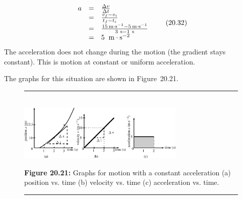     \begin{equation}
    \begin{array}{ccc}\hfill a& =& \frac{\Delta v}{\Delta t}\hfill \\ & =& \frac{{v}_{f}-{v}_{i}}{{t}_{f}-{t}_{i}}\hfill \\ & =& \frac{15\phantom{\rule{0.166667em}{0ex}}\mathrm{m}\ensuremath{\cdot}{\mathrm{s}}^{-1}-5\phantom{\rule{0.166667em}{0ex}}\mathrm{m}\ensuremath{\cdot}{\mathrm{s}}^{-1}}{3\phantom{\rule{3.33333pt}{0ex}}\mathrm{s}-1\phantom{\rule{3.33333pt}{0ex}}\mathrm{s}}\hfill \\ & =& 5\phantom{\rule{4pt}{0ex}}\phantom{\rule{0.166667em}{0ex}}\mathrm{m}\ensuremath{\cdot}{\mathrm{s}}^{-2}\hfill \end{array}\tag{20.32}
      \end{equation}
        \label{m38795*id72716}The acceleration does not change during the motion (the gradient stays constant). This is motion at constant or uniform acceleration.\par 
        \label{m38795*id72723}The graphs for this situation are shown in Figure~20.21.\par 
    \setcounter{subfigure}{0}
	\begin{figure}[H] %
    \begin{center}
    \rule[.1in]{\figurerulewidth}{.005in} \\
        \label{m38795*uid114!!!underscore!!!media}\label{m38795*uid114!!!underscore!!!printimage}\includegraphics[width=300px]{col11305.imgs/m38795_PG10C2_026.png} %
      \vspace{2pt}
    \vspace{\rubberspace}\par \begin{cnxcaption}
	  \small \textbf{Figure 20.21: }Graphs for motion with a constant acceleration (a) position vs. time (b) velocity vs. time (c) acceleration vs. time.
	\end{cnxcaption}
    \vspace{.1in}
    \rule[.1in]{\figurerulewidth}{.005in} \\
    \end{center}
 \end{figure}       
        \label{m38795*uid115}

